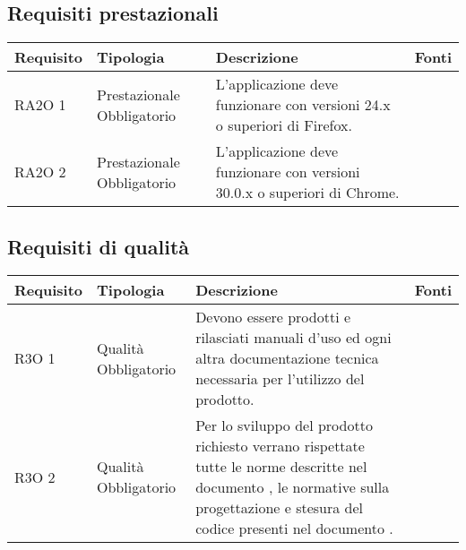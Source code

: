 \subsection{Requisiti prestazionali }

      \begin{center}
      \begin{longtable}{ | p{2cm} | p{2cm} | p{5cm} | p{2cm} |}
    
      \cellcolor[gray]{0.9} \textbf{Requisito} & \cellcolor[gray]{0.9} \textbf{Tipologia} 
      & \cellcolor[gray]{0.9} \textbf{Descrizione} & \cellcolor[gray]{0.9} \textbf{Fonti} \\ \hline
      
        RA2O 1 & Prestazionale \newline  Obbligatorio  & L’applicazione deve funzionare con versioni 24.x o superiori di Firefox. &  \\ \hline      
        RA2O 2 & Prestazionale \newline  Obbligatorio  & L’applicazione deve funzionare con versioni 30.0.x o superiori di Chrome. &  \\ \hline
      \end{longtable}
      \end{center}  
\clearpage

\subsection{Requisiti di qualità }

      \begin{center}
      \begin{longtable}{ | p{2cm} | p{2cm} | p{5cm} | p{2cm} |}
    
      \cellcolor[gray]{0.9} \textbf{Requisito} & \cellcolor[gray]{0.9} \textbf{Tipologia} 
      & \cellcolor[gray]{0.9} \textbf{Descrizione} & \cellcolor[gray]{0.9} \textbf{Fonti} \\ \hline
      
        R3O 1 & Qualità \newline  Obbligatorio  & Devono essere prodotti e rilasciati manuali d'uso ed ogni altra documentazione tecnica necessaria per l’utilizzo del prodotto. &  \\ \hline      
        R3O 2 & Qualità \newline  Obbligatorio  & Per lo sviluppo del prodotto richiesto verrano rispettate tutte le norme descritte nel documento \NormeDiProgetto{}, le normative sulla progettazione e stesura del codice presenti nel  documento \PianoDiQualifica{} . &  \\ \hline
      \end{longtable}
      \end{center}  
\clearpage

